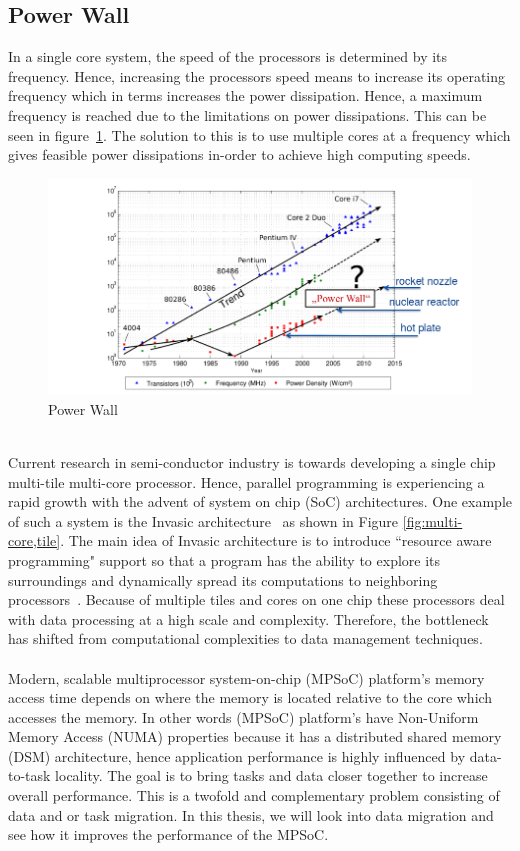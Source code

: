 \documentclass{listhesis}
\begin{document}
\subsection{Power Wall}
In a single core system, the speed of the processors is determined by its frequency. Hence, increasing the processors speed means to increase its operating frequency which in terms increases the power dissipation. Hence, a maximum frequency is reached due to the limitations on power dissipations. This can be seen in figure~\ref{fig:powerwall}. The solution to this is to use multiple cores at a frequency which gives feasible power dissipations in-order to achieve high computing speeds.\\
\begin{figure}[h!]
  \includegraphics[width=\linewidth]{powerwall.png}
  \centering
  \caption{Power Wall~\cite{chipmulticore}}
  \label{fig:powerwall}
\end{figure}
\\
Current research in semi-conductor industry is towards developing a single chip multi-tile multi-core processor. Hence, parallel programming is experiencing a rapid growth with the advent of system on chip (SoC) architectures. One example of such a system is the Invasic architecture~\cite{invasive} as shown in Figure \ref{fig:multi-core,tile}. The main idea of Invasic architecture is to introduce ``resource aware programming" support so that a program has the ability to explore its surroundings and dynamically spread its computations to neighboring processors~\cite{invasive}. Because of multiple tiles and cores on one chip these processors deal with data processing at a high scale and complexity. Therefore, the bottleneck has shifted from computational complexities to data management techniques.\\
\\
Modern, scalable multiprocessor system-on-chip (MPSoC) platform's memory access time depends on where the memory is located relative to the core which accesses the memory. In other words (MPSoC) platform's have Non-Uniform Memory Access (NUMA) properties because it has a distributed shared memory (DSM) architecture, hence application performance is highly influenced by data-to-task locality. The goal is to bring tasks and data closer together to increase overall performance. This is a twofold and complementary problem consisting of data and or task migration. In this thesis, we will look into data migration and see how it improves the performance of the MPSoC.\\
\end{document}
